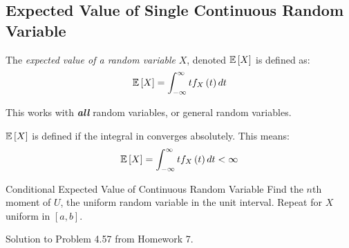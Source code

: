 	\subsection{Expected Value of Single Continuous Random Variable} \label{subsec:Expected Value of Single Continuous}
		\begin{definition} \label{def:Expected Value of Single Continuous}
			The \emph{expected value of a random variable} $X$, denoted $\operatorname{\operatorname{\mathbb{E}}} \left[ X \right]$ is defined as:
			\begin{equation} \label{eq:Expected Value of Single Continuous}
				\operatorname{\operatorname{\mathbb{E}}} \left[ X \right] = \int_{-\infty}^{\infty} t f_{X} \left( t \right) dt
			\end{equation}
			\begin{remark}
				This works with \emph{\textbf{all}} random variables, or general random variables.
			\end{remark}
			\begin{remark}
				$\operatorname{\operatorname{\mathbb{E}}} \left[ X \right]$ is defined if the integral in  converges absolutely.
				This means:
				\begin{equation*}
					\operatorname{\operatorname{\mathbb{E}}} \left[ X \right] = \int_{-\infty}^{\infty} t f_{X} \left( t \right) dt < \infty
				\end{equation*}
			\end{remark}
		\end{definition}
		\begin{example}[Problem 4.57]{Conditional Expected Value of Continuous Random Variable}
			Find the $n$th moment of $U$, the uniform random variable in the unit interval.
			Repeat for $X$ uniform in $\left[ a,b \right]$.
			
			\tcblower
			
			Solution to Problem 4.57 from Homework 7.
		\end{example}
	
